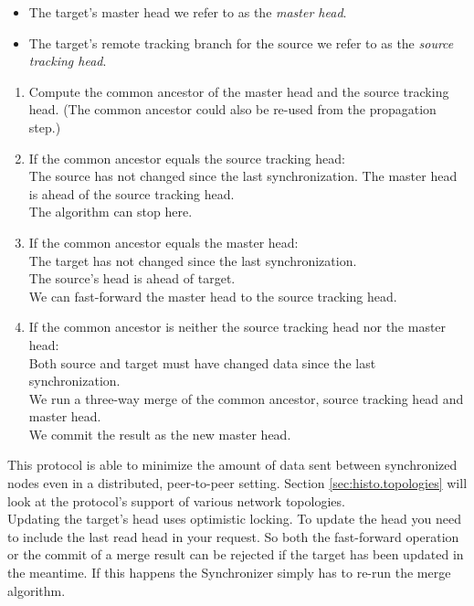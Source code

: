\begin{itemize}
\item The target's master head we refer to as the \emph{master head}.\\
\item The target's remote tracking branch for the source we refer to as the \emph{source tracking head}.
\end{itemize}

\begin{enumerate}
\item Compute the common ancestor of the master head and the source tracking head. (The common ancestor could also be re-used from the propagation step.)
\item If the common ancestor equals the source tracking head:\\
  The source has not changed since the last synchronization. The master head is ahead of the source tracking head.\\
  The algorithm can stop here.
\item If the common ancestor equals the master head:\\
  The target has not changed since the last synchronization.\\
  The source's head is ahead of target.\\
  We can fast-forward the master head to the source tracking head.
\item If the common ancestor is neither the source tracking head nor the master head:\\
  Both source and target must have changed data since the last synchronization.\\
  We run a three-way merge of the common ancestor, source tracking head and master head.\\
  We commit the result as the new master head.
\end{enumerate}

This protocol is able to minimize the amount of data sent between synchronized
nodes even in a distributed, peer-to-peer setting.
Section \ref{sec:histo.topologies} will look at the protocol's support of various network topologies.\\

Updating the target's head uses optimistic locking.
To update the head you need to include the last read head in your request.
So both the fast-forward operation or the commit of a merge result can be rejected if the target has been updated in the meantime.
If this happens the Synchronizer simply has to re-run the merge algorithm.\\

